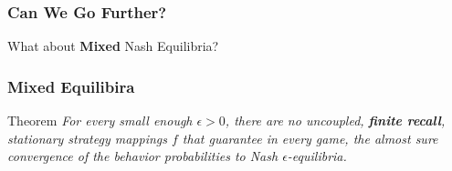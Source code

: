 \documentclass{beamer}
\begin{document}
\begin{frame}
    \frametitle{Can We Go Further? }
    \begin{center}
        What about \textbf{Mixed} Nash Equilibria?
    \end{center} 
\end{frame}

\begin{frame}
    \frametitle{Mixed Equilibira}
    \begin{alertblock}{Theorem}
        \it For every small enough $\epsilon > 0$, there are no uncoupled, \textbf{finite recall}, stationary strategy
        mappings $f$ that guarantee in every game, the almost sure convergence of the behavior probabilities
        to Nash $\epsilon$-equilibria.
    \end{alertblock}
\end{frame}
\end{document}
